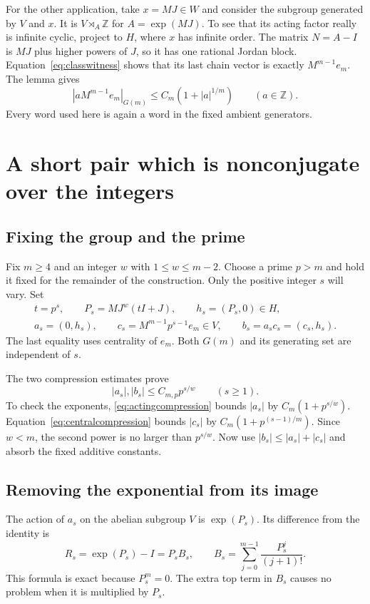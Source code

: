 \documentclass[11pt]{article}
\numberwithin{equation}{section}
\theoremstyle{definition}
\theoremstyle{remark}
\newcommand{\Z}{\mathbb Z}
\begin{document}
For the other application, take $x=MJ\in W$ and consider the subgroup generated by $V$ and $x$. It is $V\rtimes_A\Z$ for $A=\exp(MJ)$. To see that its acting factor really is infinite cyclic, project to $H$, where $x$ has infinite order. The matrix $N=A-I$ is $MJ$ plus higher powers of $J$, so it has one rational Jordan block. Equation~\eqref{eq:classwitness} shows that its last chain vector is exactly $M^{m-1}e_m$. The lemma gives
\begin{equation}\label{eq:centralcompression}
|a M^{m-1}e_m|_{G(m)}\le C_m(1+|a|^{1/m})\qquad(a\in\Z).
\end{equation}
Every word used here is again a word in the fixed ambient generators.

\section{A short pair which is nonconjugate over the integers}\label{sec:pairs}
\subsection{Fixing the group and the prime}
Fix $m\ge4$ and an integer $w$ with $1\le w\le m-2$. Choose a prime $p>m$ and hold it fixed for the remainder of the construction. Only the positive integer $s$ will vary. Set
\begin{equation}\label{eq:pairdefinition}
\begin{gathered}
t=p^s,\qquad P_s=MJ^w(tI+J),\qquad h_s=(P_s,0)\in H,\\
a_s=(0,h_s),\qquad
c_s=M^{m-1}p^{s-1}e_m\in V,\qquad
b_s=a_sc_s=(c_s,h_s).
\end{gathered}
\end{equation}
The last equality uses centrality of $e_m$. Both $G(m)$ and its generating set are independent of $s$.

The two compression estimates prove
\begin{equation}\label{eq:pairlength}
|a_s|,|b_s|\le C_{m,p}p^{s/w}\qquad(s\ge1).
\end{equation}
To check the exponents, \eqref{eq:actingcompression} bounds $|a_s|$ by $C_m(1+p^{s/w})$. Equation~\eqref{eq:centralcompression} bounds $|c_s|$ by $C_m(1+p^{(s-1)/m})$. Since $w<m$, the second power is no larger than $p^{s/w}$. Now use $|b_s|\le|a_s|+|c_s|$ and absorb the fixed additive constants.

\subsection{Removing the exponential from its image}
The action of $a_s$ on the abelian subgroup $V$ is $\exp(P_s)$. Its difference from the identity is
\begin{equation}\label{eq:Rs}
R_s=\exp(P_s)-I=P_sB_s,\qquad
B_s=\sum_{j=0}^{m-1}\frac{P_s^j}{(j+1)!}.
\end{equation}
This formula is exact because $P_s^m=0$. The extra top term in $B_s$ causes no problem when it is multiplied by $P_s$.
\end{document}
